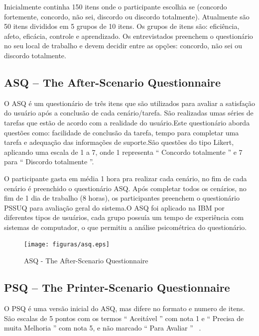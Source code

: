 	Inicialmente continha 150 itens onde o participante escolhia se (concordo fortemente, concordo, não sei, discordo ou discordo totalmente). Atualmente são 50 itens divididos em 5 grupos de 10 itens. Os grupos de itens são: eficiência, afeto, eficácia, controle e aprendizado. Os entrevistados preenchem o questionário no seu local de trabalho e devem decidir entre as opções: concordo, não sei ou discordo totalmente.

\subsection{ASQ – The After-Scenario Questionnaire}

O ASQ é um questionário de três itens que são utilizados para avaliar a satisfação do usuário após a conclusão de cada cenário/tarefa. São realizadas umas séries de tarefas que estão de acordo com a realidade do usuário.Este questionário aborda questões como: facilidade de conclusão da tarefa, tempo para completar uma tarefa e adequação das informações de suporte.São questões do tipo Likert, aplicando uma escala de 1 a 7, onde 1 representa “ Concordo totalmente ” e 7 para “ Discordo totalmente ”. ~\cite{lewis1995ibm}

O participante gasta em média 1 hora pra realizar cada cenário, no fim de cada cenário é preenchido o questionário ASQ. Após completar todos os cenários, no fim de 1 dia de trabalho (8 horas), os participantes preenchem o questionário PSSUQ para avaliação geral do sistema.O ASQ foi aplicado na IBM por diferentes tipos de usuários, cada grupo possuía um tempo de experiência com sistemas de computador, o que permitiu a análise psicométrica do questionário.

\begin{figure}[!h]
    \centering
    \texttt{[image: figuras/asq.eps]}
    \label{ASQ - The After-Scenario Questionnaire }
	\caption{ASQ - The After-Scenario Questionnaire}
\end{figure}

\subsection{PSQ – The Printer-Scenario Questionnaire}

O PSQ  é uma versão inicial do ASQ, mas difere no formato e numero de itens.  São escalas de 5 pontos com os termos “ Aceitável ” com nota 1 e “ Precisa de muita Melhoria ” com nota 5, e não marcado “ Para Avaliar ” ~\cite{lewis1995ibm}.

